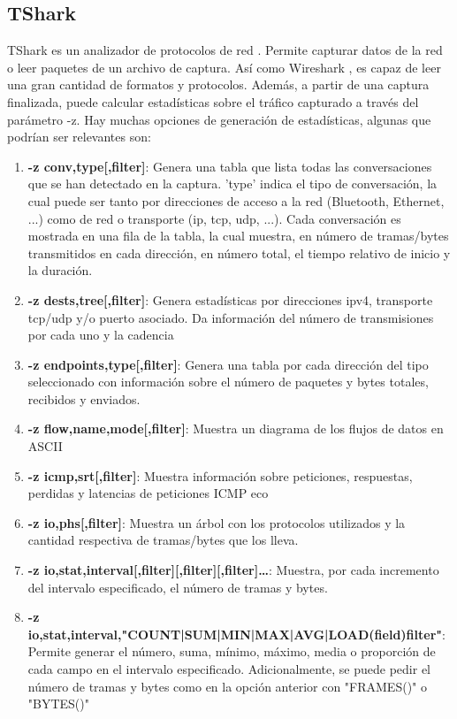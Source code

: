 \subsection{TShark}

TShark es un analizador de protocolos de red \cite{tsharkmanual}. Permite capturar datos de la red o leer paquetes de un archivo de captura. Así como Wireshark \cite{wsharkmanual}, es capaz de leer una gran cantidad de formatos y protocolos. Además, a partir de una captura finalizada, puede calcular estadísticas sobre el tráfico capturado a través del parámetro -z. Hay muchas opciones de generación de estadísticas, algunas que podrían ser relevantes son:

\begin{enumerate} 
    \item \textbf{-z conv,type[,filter]}: Genera una tabla que lista todas las conversaciones que se han detectado en la captura. 'type' indica el tipo de conversación, la cual puede ser tanto por direcciones de acceso a la red (Bluetooth, Ethernet, ...) como de red o transporte (ip, tcp, udp, ...). Cada conversación es mostrada en una fila de la tabla, la cual muestra, en número de tramas/bytes transmitidos en cada dirección, en número total, el tiempo relativo de inicio y la duración.
    \item \textbf{-z dests,tree[,filter]}: Genera estadísticas por direcciones ipv4, transporte tcp/udp y/o puerto asociado. Da información del número de transmisiones por cada uno y la cadencia
    \item \textbf{-z endpoints,type[,filter]}: Genera una tabla por cada dirección del tipo seleccionado con información sobre el número de paquetes y bytes totales, recibidos y enviados.
    \item \textbf{-z flow,name,mode[,filter]}: Muestra un diagrama de los flujos de datos en ASCII
    \item \textbf{-z icmp,srt[,filter]}: Muestra información sobre peticiones, respuestas, perdidas y latencias de peticiones ICMP eco
    \item \textbf{-z io,phs[,filter]}: Muestra un árbol con los protocolos utilizados y la cantidad respectiva de tramas/bytes que los lleva.
    \item \textbf{-z io,stat,interval[,filter][,filter][,filter]…​}: Muestra, por cada incremento del intervalo especificado, el número de tramas y bytes. 
    \item \textbf{-z io,stat,interval,"COUNT|SUM|MIN|MAX|AVG|LOAD(field)filter"}: Permite generar el número, suma, mínimo, máximo, media o proporción de cada campo en el intervalo especificado. Adicionalmente, se puede pedir el número de tramas y bytes como en la opción anterior con "FRAMES()" o "BYTES()"

\end{enumerate}
